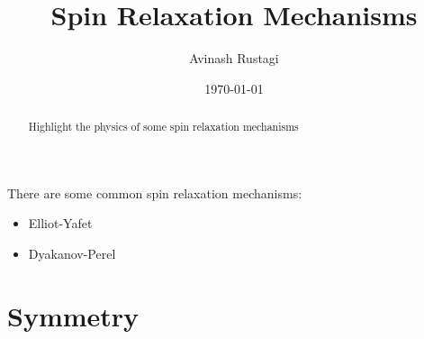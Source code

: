 \documentclass[aps,prb,onecolumn,notitlepage,showpacs,floatfix,superscriptaddress]{revtex4-1}
\begin{document}
\title{Spin Relaxation Mechanisms}

\author{Avinash Rustagi}
%
\date{\today}
\begin{abstract}
Highlight the physics of some spin relaxation mechanisms
\end{abstract}

\maketitle
%
There are some common spin relaxation mechanisms:
\begin{itemize}
\item Elliot-Yafet
\item Dyakanov-Perel
\end{itemize}

\section{Symmetry}
\end{document}
